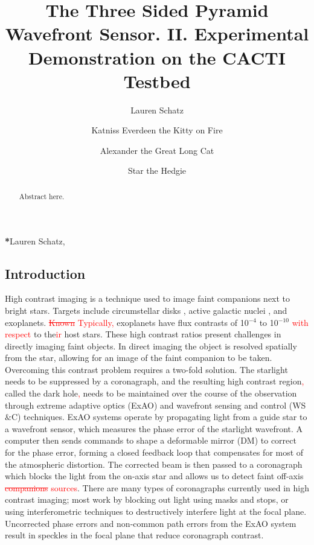 \documentclass[12pt]{spieman}  %
\title{The Three Sided Pyramid Wavefront Sensor. II.  Experimental Demonstration on the CACTI Testbed}
\author[a,*]{Lauren Schatz}
\author[b]{Katniss Everdeen the Kitty on Fire}
\author[c]{Alexander the Great Long Cat}
\author[d]{Star the Hedgie}
\affil[a]{University Name, Faculty Group, Department, Street Address, City, Country, Postal Code}
\affil[b]{Cozy pile of blankets}
\affil[c]{The very top of the cat tree}
\affil[d]{Deep inside the snuggle sack}
\newcommand{\jrmadd}[1]{\textcolor{red}{#1}}
\newcommand{\jrmrmv}[1]{\textcolor{red}{\sout{#1}}}
\begin{document}
 
\maketitle

\begin{abstract}
Abstract here. 
\end{abstract}


{\noindent \footnotesize\textbf{*}Lauren Schatz,   }

\begin{spacing}{2}   %

\section{Introduction}
\label{sect:intro}  %



High contrast imaging is a technique used to image faint companions next to bright stars. Targets include circumstellar disks \cite{rodigas2014morphology}, active galactic nuclei \cite{imanishi2020subaru}, and exoplanets\cite{bowler2016imaging}. \jrmrmv{Known} \jrmadd{Typically,}  exoplanets have flux contrasts of 10$^{-4}$ to 10$^{-10}$ \jrmadd{with respect} to the\jrmadd{ir} host stars. These high contrast ratios present challenges in directly imaging faint objects. In direct imaging the object is resolved spatially from the star, allowing for an image of the faint companion to be taken. Overcoming this contrast problem requires a two-fold solution. The starlight needs to be suppressed by a coronagraph, and the resulting high contrast region\jrmadd{,} called the dark hole\jrmadd{,} needs to be maintained over the course of the observation through extreme adaptive optics (ExAO) and wavefront sensing and control (WS$\&$C) techniques. ExAO systems operate by propagating light from a guide star to a wavefront sensor, which measures the phase error of the starlight wavefront. A computer then sends commands to shape a deformable mirror (DM) to correct for the phase error, forming a closed feedback loop that compensates for most of the atmospheric distortion. The corrected beam is then passed to a coronagraph which blocks the light from the on-axis star and allows us to detect faint off-axis \jrmrmv{companions} \jrmadd{sources}. There are many types of coronagraphs currently used in high contrast imaging; most work by blocking out light using masks and stops\cite{soummer2004apodized}, or using interferometric techniques to destructively interfere light at the focal plane.\cite{foo2005optical} Uncorrected phase errors and  non-common path errors from the ExAO system result in speckles in the focal plane that reduce coronagraph contrast.


\end{spacing}
\end{document}
